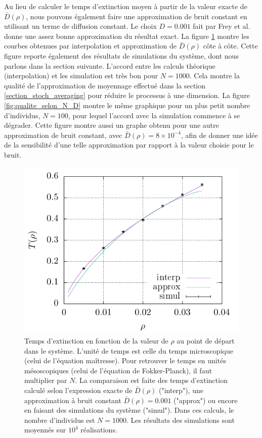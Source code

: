 \documentclass[openany,a4paper,12pt]{article}
\begin{document}
\par Au lieu de calculer le temps d'extinction moyen à partir de la valeur exacte de $\bar D(\rho)$, nous pouvons également faire une approximation de bruit constant en utilisant un terme de diffusion constant. Le choix $D=0.001$ fait par Frey et al. \cite{frey2012} donne une assez bonne approximation du résultat exact. La figure \ref{fig:T_extc} montre les courbes obtenues par interpolation et approximation de $\bar D(\rho)$ côte à côte. Cette figure reporte également des résultats de simulations du système, dont nous parlons dans la section suivante. L'accord entre les calculs théorique (interpolation) et les simulation est très bon pour $N=1000$. Cela montre la qualité de l'approximation de moyennage effectué dans la section \ref{section_stoch_averaging} pour réduire le processus à une dimension. La figure \ref{fig:qualite_selon_N_D} montre le même graphique pour un plus petit nombre d'individus, $N=100$, pour lequel l'accord avec la simulation commence à se dégrader. Cette figure montre aussi un graphe obtenu pour une autre approximation de bruit constant, avec $\bar D(\rho) = 8\times 10^{-4}$, afin de donner une idée de la sensibilité d'une telle approximation par rapport à la valeur choisie pour le bruit. 

\begin{figure}[t]
	\centering
	\includegraphics[width=0.9\linewidth]{figures/extc_time_comparison}
	\caption{Temps d'extinction en fonction de la valeur de $\rho$ au point de départ dans le système. L'unité de temps est celle du temps microscopique (celui de l'équation maîtresse). Pour retrouver le temps en unités mésoscopiques (celui de l'équation de Fokker-Planck), il faut multiplier par $N$. La comparaison est faite des temps d'extinction calculé selon l'expression exacte de $\bar D(\rho)$ ("interp"), une approximation à bruit constant $\bar D(\rho)=0.001$ ("approx") ou encore en faisant des simulations du système ("simul"). Dans ces calculs, le nombre d'individus est $N=1000$. Les résultats des simulations sont moyennés sur $10^4$ réalisations.}
	\label{fig:T_extc}
\end{figure}
\end{document}
